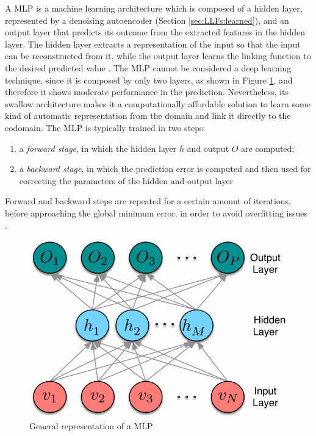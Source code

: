 A MLP is a machine learning architecture which is composed of a hidden layer, represented by a denoising autoencoder (Section \ref{sec:LLFs:learned}), and an output layer that predicts its outcome from the extracted features in the hidden layer. The hidden layer extracts a representation of the input so that the input can be reconstructed from it, while the output layer learns the linking function to the desired predicted value \cite{PAMI}. The MLP cannot be considered a deep learning technique, since it is composed by only two layers, as shown in Figure \ref{fig:ML:MLP}, and therefore it shows moderate performance in the prediction. Nevertheless, its swallow architecture makes it a computationally affordable solution to learn some kind of automatic representation from the domain and link it directly to the codomain. The MLP is typically trained in two steps:
\begin{enumerate}
	\item
	a \textit{forward stage}, in which the hidden layer $h$ and output $O$ are computed;
	\item
	a \textit{backward stage}, in which the prediction error is computed and then used for correcting the parameters of the hidden and output layer
\end{enumerate}
Forward and backward steps are repeated for a certain amount of iterations, before approaching the global minimum error, in order to avoid overfitting issues \cite{PAMI}.

\begin{figure}[tbp]
	\centering
	\includegraphics[width=.6\textwidth]{img/ML/MLP.pdf}
	\caption{General representation of a MLP}
	\label{fig:ML:MLP}
\end{figure} 


